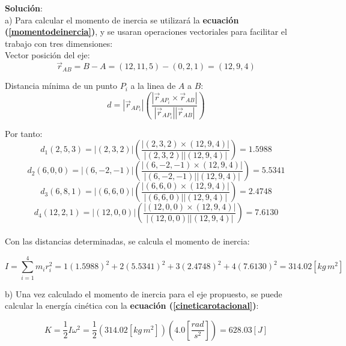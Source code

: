 \documentclass[letter,twoside,11pt]{article}
\begin{document}
\begin{minipage}[b]{.9\linewidth}
\textbf{Solución}:\\
a) Para calcular el momento de inercia se utilizará la \textbf{ecuación
(\ref{momentodeinercia})}, y se usaran operaciones vectoriales para facilitar el
trabajo con tres dimensiones: \\

Vector posición del eje:
\begin{equation*}
    \vec{r}_{AB} = B - A = (12,11,5) - (0,2,1) = (12,9,4)
\end{equation*}

Distancia mínima de un punto $P_i$ a la linea de $A$ a $B$:
\begin{equation*}
    d = | \vec{r}_{AP_i} | \left(\frac{| \vec{r}_{AP_i} \times \vec{r}_{AB} |}{|\vec{r}_{AP_i}| |\vec{r}_{AB}|} \right)
\end{equation*}

Por tanto: \\
\begin{equation*}
    d_1(2,5,3) = |(2,3,2)| \left(\frac{|(2,3,2)\times(12,9,4)|}{|(2,3,2)||(12,9,4)|}\right) = 1.5988
\end{equation*}
\begin{equation*}
    d_2(6,0,0) = |(6,-2,-1)| \left(\frac{|(6,-2,-1)\times(12,9,4)|}{|(6,-2,-1)||(12,9,4)|}\right) = 5.5341
\end{equation*}
\begin{equation*} 
    d_3(6,8,1) = |(6,6,0)| \left(\frac{|(6,6,0)\times(12,9,4)|}{|(6,6,0)||(12,9,4)|}\right) = 2.4748
\end{equation*}
\begin{equation*}
    d_4(12,2,1) = |(12,0,0)| \left(\frac{|(12,0,0)\times(12,9,4)|}{|(12,0,0)||(12,9,4)|}\right) = 7.6130
\end{equation*}
\\

Con las distancias determinadas, se calcula el momento de inercia:
\end{minipage}

\begin{minipage}[b]{.9\linewidth}
\begin{equation*}
    I = \sum_{i=1}^{4} m_i r^2_i = 1 (1.5988)^2 + 2 (5.5341)^2 + 3 (2.4748)^2 + 4 (7.6130)^2 = 314.02 [kg\, m^2]
\end{equation*}

b) Una vez calculado el momento de inercia para el eje propuesto, se puede
calcular la energía cinética con la \textbf{ecuación
(\ref{cineticarotacional})}:

\begin{equation*}
    K = \frac{1}{2} I \omega^2 =  \frac{1}{2} (314.02 [kg\, m^2]) \left(4.0 \left[\frac{rad}{s^2}\right]\right) = 628.03 [J]
\end{equation*}
\end{minipage}
\end{document}
